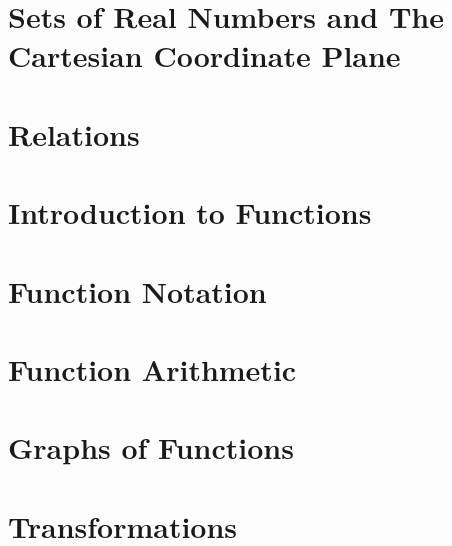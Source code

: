 \section{Sets of Real Numbers and The Cartesian Coordinate Plane}



\newpage

\section{Relations}



\newpage

\section{Introduction to Functions}



\newpage

\section{Function Notation}



\newpage

\section{Function Arithmetic}



\newpage

\section{Graphs of Functions}



\newpage

\section{Transformations}



\newpage